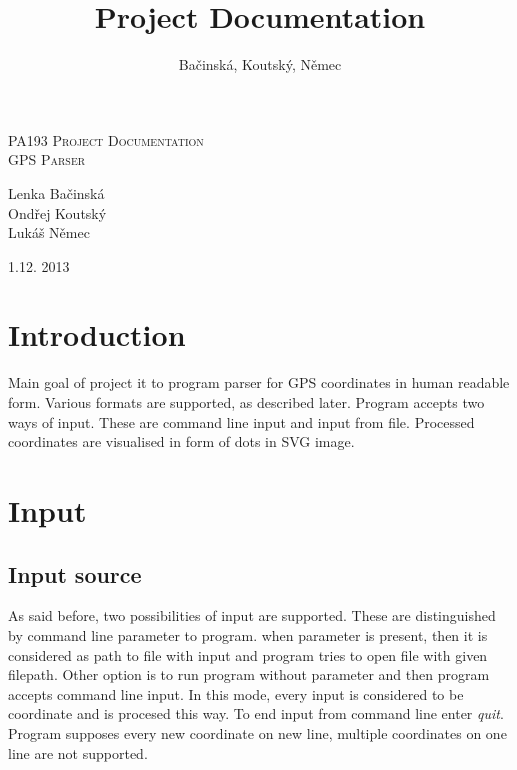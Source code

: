 \documentclass[12pt,titlepage]{article}
\title{Project Documentation}
\author{Bačinská, Koutský, Němec}
\begin{document}
\begin{titlepage}
\begin{center}
\textsc{\LARGE PA193 Project Documentation}\\[0.6cm]
\textsc{\Large GPS Parser}\\[1cm]


\begin{multicols}{3}
\Large{Lenka Bačinská}\\[1cm]


\columnbreak
\Large{Ondřej Koutský}\\[1cm]

\columnbreak
\Large{Lukáš Němec}\\[1cm]
\end{multicols}
\bigskip
\bigskip

\Large{1.12. 2013}
\end{center}
\end{titlepage}



\tableofcontents
\newpage

\section{Introduction}
Main goal of project it to program parser for GPS coordinates in human readable form.
Various formats are supported, as described later. Program accepts two ways of input. These are
command line input and input from file. Processed coordinates are visualised in form of dots in 
SVG image. 

\section{Input}
\subsection{Input source}
As said before, two possibilities of input are supported. These are distinguished by command line 
parameter to program. when parameter is present, then it is considered as path to file with input 
and program tries to open file with given filepath. Other option is to run program without parameter and then program accepts command line input. In this mode, every input is considered to be coordinate and is procesed this way. To end input from command line enter \textit{quit}. 
Program supposes every new coordinate on new line, multiple coordinates on one line are not 
supported.
\end{document}
